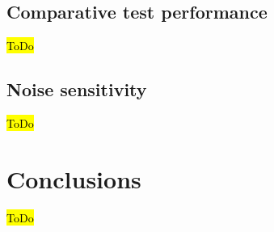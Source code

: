 \documentclass{article}
\begin{document}
\subsection{Comparative test performance}

\hl{ToDo}

\subsection{Noise sensitivity}

\hl{ToDo}



\section{Conclusions}

\hl{ToDo}



\end{document}
